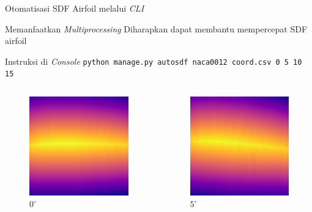 \begin{frame}{Otomatisasi SDF Airfoil melalui \textit{CLI}}
  \begin{block}{Memanfaatkan \textit{Multiprocessing}}
    Diharapkan dapat membantu mempercepat SDF airfoil
  \end{block}

  \begin{block}{Instruksi di \textit{Console}}
    \texttt{python manage.py autosdf naca0012 coord.csv 0 5 10 15}
  \end{block}

  \begin{columns}[t]
    \begin{column}{.25\linewidth}
      \begin{figure}[h]
        \centering
        \includegraphics[width=0.5\linewidth]{statics/naca0012_0.0}
        \caption{$0^\circ$}
      \end{figure}
    \end{column}

    \begin{column}{.25\linewidth}
      \begin{figure}[h]
        \centering
        \includegraphics[width=0.5\linewidth]{statics/naca0012_5.0}
        \caption{$5^\circ$}
      \end{figure}
    \end{column}


\end{columns}
\end{frame}
